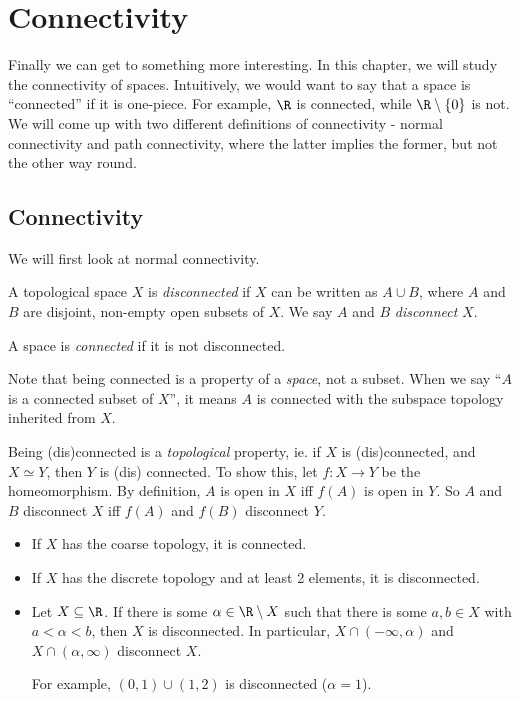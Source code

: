 \documentclass[a4paper]{article}
\begin{document}
\section{Connectivity}
Finally we can get to something more interesting. In this chapter, we will study the connectivity of spaces. Intuitively, we would want to say that a space is ``connected'' if it is one-piece. For example, $\R$ is connected, while $\R \setminus \{0\}$ is not. We will come up with two different definitions of connectivity - normal connectivity and path connectivity, where the latter implies the former, but not the other way round.

\subsection{Connectivity}
We will first look at normal connectivity.
\begin{defi}
  A topological space $X$ is \emph{disconnected} if $X$ can be written as $A\cup B$, where $A$ and $B$ are disjoint, non-empty open subsets of $X$. We say $A$ and $B$ \emph{disconnect} $X$.

  A space is \emph{connected} if it is not disconnected.
\end{defi}
Note that being connected is a property of a \emph{space}, not a subset. When we say ``$A$ is a connected subset of $X$'', it means $A$ is connected with the subspace topology inherited from $X$.

Being (dis)connected is a \emph{topological} property, ie. if $X$ is (dis)connected, and $X\simeq Y$, then $Y$ is (dis) connected. To show this, let $f: X\to Y$ be the homeomorphism. By definition, $A$ is open in $X$ iff $f(A)$ is open in $Y$. So $A$ and $B$ disconnect $X$ iff $f(A)$ and $f(B)$ disconnect $Y$.

\begin{eg}\leavevmode
  \begin{itemize}
    \item If $X$ has the coarse topology, it is connected.
    \item If $X$ has the discrete topology and at least 2 elements, it is disconnected.
    \item Let $X\subseteq \R$. If there is some $\alpha \in \R\setminus X$ such that there is some $a, b\in X$ with $a < \alpha < b$, then $X$ is disconnected. In particular, $X\cap (-\infty, \alpha)$ and $X\cap (\alpha, \infty)$ disconnect $X$.

      For example, $(0, 1)\cup (1, 2)$ is disconnected ($\alpha = 1$).
  \end{itemize}
\end{eg}
\end{document}
